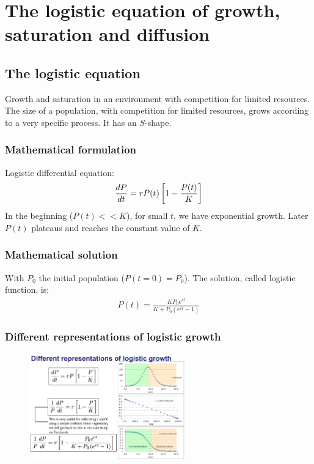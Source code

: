 \section{The logistic equation of growth, saturation and diffusion}

\subsection{The logistic equation}

Growth and saturation in an environment with competition for limited resources.
The size of a population, with competition for limited resources, grows according to
a very specific process. It has an $S$-shape.

\subsubsection{Mathematical formulation}

Logistic differential equation:
\begin{align*}
    \frac{dP}{dt} = r P(t) \left[ 1 - \frac{P(t)}{K} \right]
\end{align*}
In the beginning ($P(t) << K$), for small $t$, we have exponential growth.
Later $P(t)$ plateaus and reaches the constant value of $K$.

\subsubsection{Mathematical solution}

With $P_0$ the initial population ($P(t=0)=P_0$). The solution, called
logistic function, is:
\begin{align*}
    P(t) = \frac{K P_0 e^{r t}}{K + P_0 (e^{r t} - 1)}
\end{align*}

\subsubsection{Different representations of logistic growth}

\begin{figure}[h]
    \centering
    \includegraphics[width=0.6\textwidth]{Pictures/log_growth_diff_rep.png}
\end{figure}

